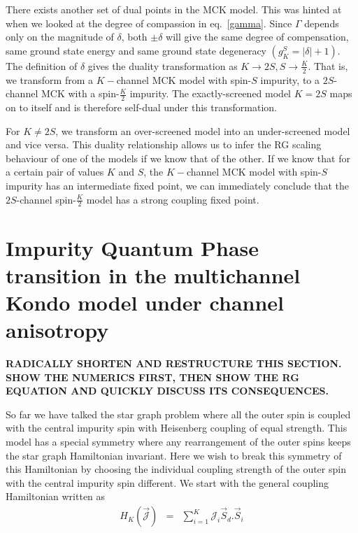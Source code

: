 \documentclass[reprint,prb,superscriptaddress]{revtex4-2}
\begin{document}
There exists another set of dual points in the MCK model. This was hinted at when we looked at the degree of compassion in eq.~\ref{gamma}. Since \(\Gamma\) depends only on the magnitude of \(\delta\), both \(\pm \delta\) will give the same degree of compensation, same ground state energy and same ground state degeneracy \(\left(g^S_K = |\delta|+1\right)\). The definition of \(\delta\) gives the duality transformation as \(K \to 2S, S \to \frac{K}{2}\). That is, we transform from a \(K-\)channel MCK model with spin-\(S\) impurity, to a \(2S\)-channel MCK with a spin-\(\frac{K}{2}\) impurity. The exactly-screened model \(K=2S\) maps on to itself and is therefore self-dual under this transformation.

For \(K \neq 2S\), we transform an over-screened model into an under-screened model and vice versa. This duality relationship allows us to infer the RG scaling behaviour of one of the models if we know that of the other. If we know that for a certain pair of values \(K\) and \(S\), the \(K-\)channel MCK model with spin-\(S\) impurity has an intermediate fixed point, we can immediately conclude that the \(2S\)-channel spin-\(\frac{K}{2}\) model has a strong coupling fixed point.

\section{Impurity Quantum Phase transition in the multichannel Kondo model under channel anisotropy}
\label{anisotropic_rg}
\textbf{RADICALLY SHORTEN AND RESTRUCTURE THIS SECTION. SHOW THE NUMERICS FIRST, THEN SHOW THE RG 
EQUATION AND QUICKLY DISCUSS ITS CONSEQUENCES.}

\noindent So far we have talked the star graph problem where all the outer spin is coupled with the central impurity spin with Heisenberg coupling of equal strength. This model has a special symmetry where any rearrangement of the outer spins keeps the star graph Hamiltonian invariant. Here we wish to break this symmetry of this Hamiltonian by choosing the individual coupling strength of the outer spin with the central impurity spin different. We start with the general coupling Hamiltonian written as 
\begin{eqnarray}
H_K (\vec{{\mathcal{J}}}) &=& \sum_{i=1}^{K} {\mathcal{J}}_i\vec{S}_d.\vec{S}_i
\label{eq:anisotropy}
\end{eqnarray}
\end{document}
